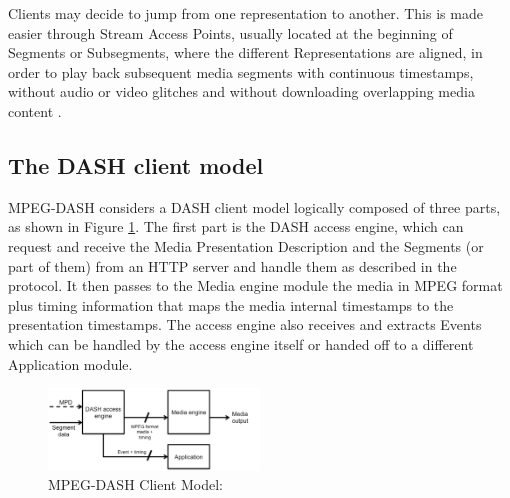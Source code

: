 \documentclass[openany]{book}
\begin{document}
Clients may decide to jump from one representation to another. This is made easier through Stream Access Points, usually located at the beginning of Segments or Subsegments, where the different Representations are aligned, in order to play back subsequent media segments with continuous timestamps, without audio or video glitches and without downloading overlapping media content \cite{MPEG, DASH2}.

\subsection{The DASH client model}
MPEG-DASH \cite{MPEG} considers a DASH client model logically composed of three parts, as shown in Figure \ref{fig:client}. The first part is the DASH access engine, which can request and receive the Media Presentation Description and the Segments (or part of them) from an HTTP server and handle them as described in the protocol. It then passes to the Media engine module the media in MPEG format plus timing information that maps the media internal timestamps to the presentation timestamps. The access engine also receives and extracts Events which can be handled by the access engine itself or handed off to a different Application module.
\begin{figure}[ht]
\centering
\includegraphics[width=0.5\textwidth]{Client.png}
\caption{\label{fig:client}MPEG-DASH Client Model: \cite{MPEG}}
\end{figure}
\end{document}
